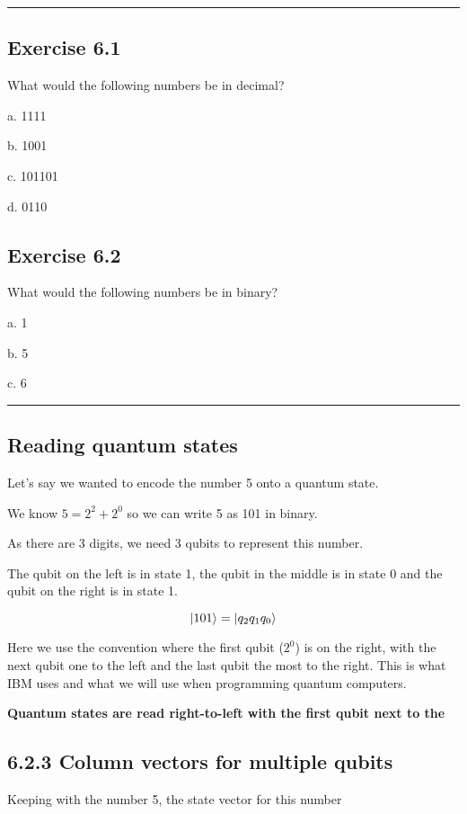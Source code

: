 \documentclass{book}
\begin{document}
\hrule

\subsection{Exercise 6.1}

What would the following numbers be in decimal?

a. 1111

b. 1001

c. 101101

d. 0110

\subsection{Exercise 6.2}

What would the following numbers be in binary? 

a. 1 

b. 5

c. 6 \newline

\hrule
\subsection{ Reading quantum states }

Let's say we wanted to encode the number 5 onto a quantum state. 

We know $ 5 = 2^2 + 2^0$ so we can write 5 as 101 in binary. 

As there are 3 digits, we need 3 qubits to represent this number. 

The qubit on the left is in state 1, the qubit in the middle is in state 0 and the qubit on the right is in state 1. 

$$ \ket{101} = \ket{q_2q_1q_0} $$

Here we use the convention where the first qubit ($2^0$) is on the right, with the next qubit one to the left and the last qubit the most to the right. This is what IBM uses and what we will use when programming quantum computers.

\textbf{Quantum states are read right-to-left with the first qubit next to the $\>$}

\subsection{6.2.3 Column vectors for multiple qubits}

Keeping with the number 5, the state vector for this number 
\end{document}
